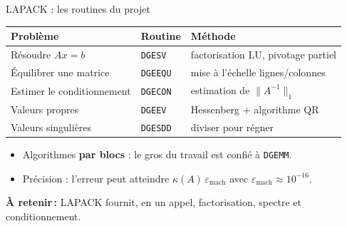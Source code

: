 \documentclass[aspectratio=169,11pt,t]{beamer}
\newcommand{\takeaway}[1]{\vfill\noindent{\color{gold}\vrule width 3pt}\colorbox{lightbg}{\parbox[c]{\dimexpr\textwidth-3pt-2\fboxsep\relax}{\vphantom{Ég}\small\textbf{\color{navy}À retenir\,:} #1\vphantom{Ég}}}\par}
\begin{document}
\begin{frame}{LAPACK : les routines du projet}
    \centering\small
    \begin{tabular}{l l l}
        \toprule
        \textbf{Problème} & \textbf{Routine} & \textbf{Méthode}\\
        \midrule
        Résoudre $Ax=b$ & \texttt{DGESV} & factorisation LU, pivotage partiel\\
        Équilibrer une matrice & \texttt{DGEEQU} & mise à l'échelle lignes/colonnes\\
        Estimer le conditionnement & \texttt{DGECON} & estimation de $\|A^{-1}\|_1$\\
        Valeurs propres & \texttt{DGEEV} & Hessenberg + algorithme QR\\
        Valeurs singulières & \texttt{DGESDD} & diviser pour régner\\
        \bottomrule
    \end{tabular}
    \vspace{0.3cm}
    \begin{itemize}
        \item Algorithmes \textbf{par blocs} : le gros du travail est confié à \texttt{DGEMM}.
        \item Précision : l'erreur peut atteindre $\kappa(A)\,\varepsilon_{\mathrm{mach}}$ avec $\varepsilon_{\mathrm{mach}}\approx10^{-16}$.
    \end{itemize}
    \takeaway{LAPACK fournit, en un appel, factorisation, spectre et conditionnement.}
\end{frame}
\end{document}

